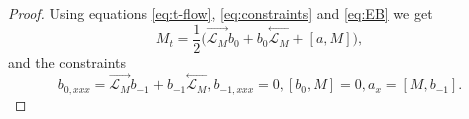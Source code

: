 \documentclass[10pt,a4paper]{article}
\numberwithin{equation}{section}
\theoremstyle{plain}
\theoremstyle{definition}
\newcommand{\InMb}{\stackrel{\leftarrow}{\mathcal{L}_{M}}}
\newcommand{\InMf}{\stackrel{\rightarrow}{\mathcal{L}_{M}}}
\begin{document}
\begin{proof} 
Using equations \eqref{eq:t-flow}, \eqref{eq:constraints} and \eqref{eq:EB} we get
\begin{equation} 
M_t=\frac12\big(\InMf b_0+b_0\InMb+[a,M]\big) \label{eq:Mt}, 
\end{equation}
and the constraints 
\begin{subequations}
\begin{equation}
b_{0,xxx}=\InMf b_{-1}+b_{-1}\InMb, \label{eq:b0}
\end{equation}
\begin{equation}
b_{-1,xxx}=0, \label{eq:b-1}
\end{equation}
\begin{equation}
[b_0, M]=0, \label{eq:b0M}
\end{equation}
\begin{equation}
a_{x}=[M,b_{-1}].  \label{eq:a0x}
\end{equation}
\end{subequations}


\end{proof}
\end{document}
